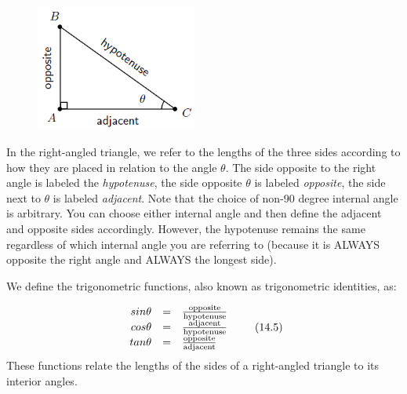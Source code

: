 	\begin{figure}[H] %
    \begin{center}
    \label{m39408*id79667!!!underscore!!!media}\label{m39408*id79667!!!underscore!!!printimage}\includegraphics[width=200px]{col11306.imgs/m39408_MG10C15_003.png} %
      \vspace{2pt}
    \vspace{.1in}
    \end{center}
 \end{figure}       
      \par 
      \label{m39408*id79673}In the right-angled triangle, we refer to the lengths of the three sides according to how they are placed in relation to the angle $\theta $. The side opposite to the right angle is labeled the \textsl{hypotenuse}, the side opposite $\theta $ is labeled \textsl{opposite}, the side next to $\theta $ is labeled \textsl{adjacent}. Note that the choice of non-90 degree internal angle is arbitrary. You can choose either internal angle and then define the adjacent and opposite sides accordingly. However, the hypotenuse remains the same regardless of which internal angle you are referring to (because it is ALWAYS opposite the right angle and ALWAYS the longest side).\par 
      \label{m39408*id79725}We define the trigonometric functions, also known as trigonometric identities, as:
\par 
      \label{m39408*uid21}\nopagebreak\noindent{}
    \begin{equation}
    \begin{array}{ccc}\hfill sin\theta & =& \frac{\mathrm{opposite}}{\mathrm{hypotenuse}}\hfill \\ \hfill cos\theta & =& \frac{\mathrm{adjacent}}{\mathrm{hypotenuse}}\hfill \\ \hfill tan\theta & =& \frac{\mathrm{opposite}}{\mathrm{adjacent}}\hfill \end{array}\tag{14.5}
      \end{equation}
      \label{m39408*id79934}These functions relate the lengths of the sides of a right-angled triangle to its interior angles.\par 
